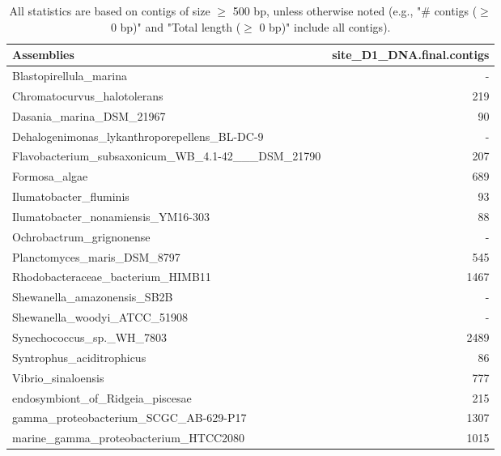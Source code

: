 \documentclass[12pt,a4paper]{article}
\begin{document}
\begin{table}[ht]
\begin{center}
\caption{All statistics are based on contigs of size $\geq$ 500 bp, unless otherwise noted (e.g., "\# contigs ($\geq$ 0 bp)" and "Total length ($\geq$ 0 bp)" include all contigs).}
\begin{tabular}{|l*{1}{|r}|}
\hline
Assemblies & site\_D1\_DNA.final.contigs \\ \hline
Blastopirellula\_marina & - \\ \hline
Chromatocurvus\_halotolerans & 219 \\ \hline
Dasania\_marina\_DSM\_21967 & 90 \\ \hline
Dehalogenimonas\_lykanthroporepellens\_BL-DC-9 & - \\ \hline
Flavobacterium\_subsaxonicum\_WB\_4.1-42\_\_\_DSM\_21790 & 207 \\ \hline
Formosa\_algae & 689 \\ \hline
Ilumatobacter\_fluminis & 93 \\ \hline
Ilumatobacter\_nonamiensis\_YM16-303 & 88 \\ \hline
Ochrobactrum\_grignonense & - \\ \hline
Planctomyces\_maris\_DSM\_8797 & 545 \\ \hline
Rhodobacteraceae\_bacterium\_HIMB11 & 1467 \\ \hline
Shewanella\_amazonensis\_SB2B & - \\ \hline
Shewanella\_woodyi\_ATCC\_51908 & - \\ \hline
Synechococcus\_sp.\_WH\_7803 & 2489 \\ \hline
Syntrophus\_aciditrophicus & 86 \\ \hline
Vibrio\_sinaloensis & 777 \\ \hline
endosymbiont\_of\_Ridgeia\_piscesae & 215 \\ \hline
gamma\_proteobacterium\_SCGC\_AB-629-P17 & 1307 \\ \hline
marine\_gamma\_proteobacterium\_HTCC2080 & 1015 \\ \hline
\end{tabular}
\end{center}
\end{table}
\end{document}
